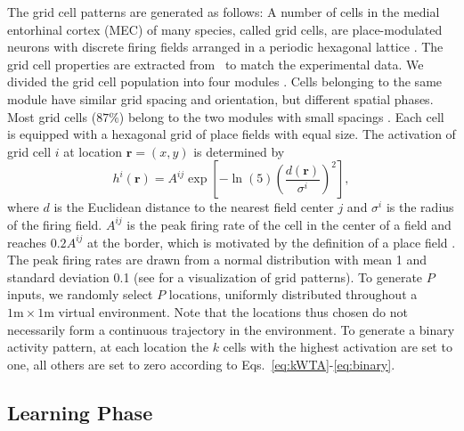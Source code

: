 \documentclass[utf8]{frontiersSCNS} %
\begin{document}
The grid cell patterns are generated as follows: A number of cells in the medial entorhinal cortex (MEC) of many species, called grid cells, are place-modulated neurons with discrete firing fields arranged in a periodic hexagonal lattice \cite{hafting2005microstructure}. The grid cell properties are extracted from~\cite{stensola2012entorhinal} to match the experimental data. We divided the grid cell population into four modules \cite{stensola2012entorhinal}. Cells belonging to the same module have similar grid spacing and orientation, but different spatial phases. Most grid cells ($87\%$) belong to the two modules with small spacings \cite{stensola2012entorhinal}. Each cell is equipped with a hexagonal grid of place fields with equal size. The activation of grid cell $i$ at location $\mathbf{r}=(x,y)$ is determined by
\begin{equation}
\label{eq:grid}
h^i(\mathbf{r}) = A^{ij} \exp \left[ -\ln(5) \left(\frac{d(\mathbf{r})}{\sigma^i}\right)^2 \right],
\end{equation}
where $d$ is the Euclidean distance to the nearest field center $j$ and $\sigma^i$ is the radius of the firing field. $A^{ij}$ is the peak firing rate of the cell in the center of a field and reaches $0.2 A^{ij}$ at the border, which is motivated by the definition of a place field \cite{hafting2005microstructure}. The peak firing rates are drawn from a normal distribution with mean 1 and standard deviation 0.1 (see \cite{neher2015memory} for a visualization of grid patterns). To generate $P$ inputs, we randomly select $P$ locations, uniformly distributed throughout a $1\textrm{m} \times 1\textrm{m}$ virtual environment. Note that the locations thus chosen do not necessarily form a continuous trajectory in the environment. To generate a binary activity pattern, at each location the $k$ cells with the highest activation are set to one, all others are set to zero according to Eqs.~\ref{eq:kWTA}-\ref{eq:binary}.


\subsection{Learning Phase}
\end{document}
